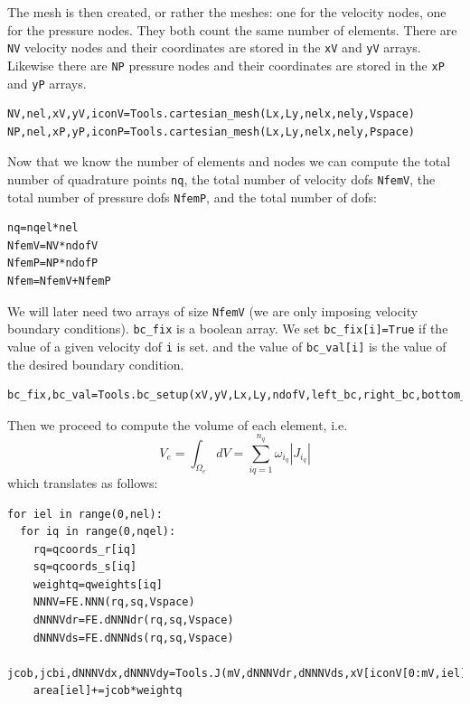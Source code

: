 The mesh is then created, or rather the meshes: one for the 
velocity nodes, one for the pressure nodes. They both count the 
same number of elements. There are \lstinline{NV} velocity nodes and their
coordinates are stored in the \lstinline{xV} and \lstinline{yV} arrays.
Likewise there are \lstinline{NP} pressure nodes and their
coordinates are stored in the \lstinline{xP} and \lstinline{yP} arrays. 

\begin{lstlisting}
NV,nel,xV,yV,iconV=Tools.cartesian_mesh(Lx,Ly,nelx,nely,Vspace)
NP,nel,xP,yP,iconP=Tools.cartesian_mesh(Lx,Ly,nelx,nely,Pspace)
\end{lstlisting}

Now that we know the number of elements and nodes we can compute the 
total number of quadrature points \lstinline{nq}, 
the total number of velocity dofs \lstinline{NfemV}, 
the total number of pressure dofs \lstinline{NfemP}, 
and the total number of dofs:

\begin{lstlisting}
nq=nqel*nel
NfemV=NV*ndofV
NfemP=NP*ndofP
Nfem=NfemV+NfemP
\end{lstlisting}

We will later need two arrays of size \lstinline{NfemV} (we are only imposing
velocity boundary conditions). \lstinline{bc_fix} is a boolean array.
We set \lstinline{bc_fix[i]=True} if the value of a given velocity dof \lstinline{i} is set. 
and the value of \lstinline{bc_val[i]} is the value of the desired boundary condition.

\begin{lstlisting}
bc_fix,bc_val=Tools.bc_setup(xV,yV,Lx,Ly,ndofV,left_bc,right_bc,bottom_bc,top_bc)
\end{lstlisting}

Then we proceed to compute the volume of each element, i.e. 
\[
V_e = \int_{\Omega_e} dV = \sum_{iq=1}^{n_q} \omega_{i_q} |J_{i_q}|
\]
which translates as follows: 
\begin{lstlisting}
for iel in range(0,nel):
  for iq in range(0,nqel):
    rq=qcoords_r[iq]
    sq=qcoords_s[iq]
    weightq=qweights[iq]
    NNNV=FE.NNN(rq,sq,Vspace)
    dNNNVdr=FE.dNNNdr(rq,sq,Vspace)
    dNNNVds=FE.dNNNds(rq,sq,Vspace)
    jcob,jcbi,dNNNVdx,dNNNVdy=Tools.J(mV,dNNNVdr,dNNNVds,xV[iconV[0:mV,iel]],yV[iconV[0:mV,iel]])
    area[iel]+=jcob*weightq
\end{lstlisting}



\newpage
